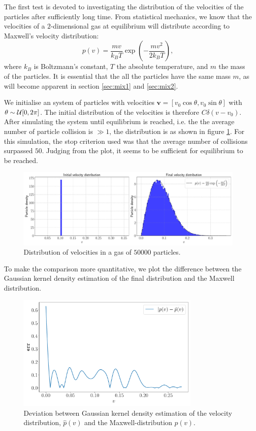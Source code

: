 The first test is devoted to investigating the distribution of the velocities of the particles after sufficiently long time. From statistical mechanics, we know that the velocities of a $2$-dimensional gas at equilibrium will distribute according to Maxwell's velocity distribution: 
\[
	p(v) = \frac{mv}{k_B T} \exp{\left(- \frac{mv^2}{2 k_B T}\right)},
\]
where $k_B$ is Boltzmann's constant, $T$ the absolute temperature, and $m$ the mass of the particles. It is essential that the all the particles have the same mass $m$, as will become apparent in section \ref{sec:mix1} and \ref{sec:mix2}.

We initialise an system of particles with velocities $\mathbf{v} = [v_0 \cos{\theta} , v_0 \sin{\theta}]$ with $\theta \sim \mathcal{U}[0,2\pi]$. The initial distribution of the velocities is therefore $C\delta (v - v_0)$. After simulating the system until equilibrium is reached, i.e. the the average number of particle collision is $\gg 1$, the distribution is as shown in figure \ref{fig:dist_1}. For this simulation, the stop criterion used was that the average number of collisions surpassed $50$. Judging from the plot, it seems to be sufficient for equilibrium to be reached. 

\begin{figure}[htb]
	\centering
	\includegraphics[width=\textwidth]{../fig/distribution}
	\caption{Distribution of velocities in a gas of $50000$ particles.}
	\label{fig:dist_1}
\end{figure}

To make the comparison more quantitative, we plot the difference between the Gaussian kernel density estimation of the final distribution and the Maxwell distribution. 

\begin{figure}[htb]
	\centering
	\includegraphics[width=0.8\textwidth]{../fig/kde_diff}
	\caption{Deviation between Gaussian kernel density estimation of the velocity distribution, $\hat{p}(v)$ and the Maxwell-distribution $p(v)$.}
	\label{fig:dist_2}
\end{figure}